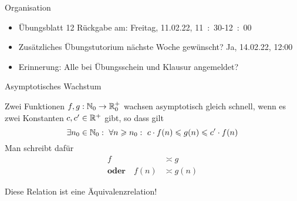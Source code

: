 \begin{frame}{Organisation}
	\begin{itemize}[<+->]
		\item Übungsblatt 12 Rückgabe am: Freitag, 11.02.22, 11~:~30-12~:~00
		\item Zusätzliches Übungstutorium nächste Woche gewünscht? \impl Ja, 14.02.22, 12:00
		\item Erinnerung: Alle bei Übungsschein und Klausur angemeldet?
		\end{itemize}
\end{frame}

\framePrevEpisode


\begin{frame}{Asymptotisches Wachstum}
	\begin{Definition}
		Zwei Funktionen $f,g: \mathbb{N}_0 \to \mathbb{R}_0^+$ wachsen asymptotisch gleich schnell, wenn es zwei Konstanten $c, c' \in \mathbb{R}^+$ gibt, so dass gilt $$\exists n_0 \in \mathbb{N}_0: \ \forall n \geqslant n_0: \ c \cdot f(n) \leqslant g(n) \leqslant c' \cdot f(n) $$
		Man schreibt dafür 
		\begin{align*}
			f &\asymp g \\
			\textbf{oder} \quad f(n) &\asymp g(n) 
		\end{align*}
	\end{Definition} \pause
	Diese Relation ist eine Äquivalenzrelation!
\end{frame}







